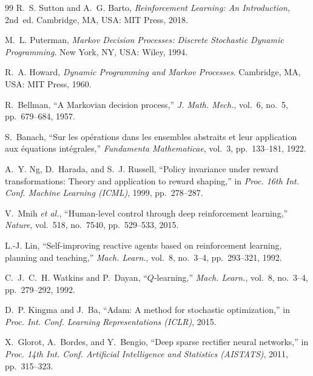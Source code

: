 \documentclass[11pt,letterpaper]{article}
\begin{document}

\begin{thebibliography}{99}
R.~S. Sutton and A.~G. Barto, \emph{Reinforcement Learning: An Introduction}, 2nd~ed. Cambridge, MA, USA: MIT Press, 2018.

M.~L. Puterman, \emph{Markov Decision Processes: Discrete Stochastic Dynamic Programming}. New York, NY, USA: Wiley, 1994.

R.~A. Howard, \emph{Dynamic Programming and Markov Processes}. Cambridge, MA, USA: MIT Press, 1960.

R.~Bellman, ``A Markovian decision process,'' \emph{J. Math. Mech.}, vol.~6, no.~5, pp.~679--684, 1957.

S.~Banach, ``Sur les op\'erations dans les ensembles abstraits et leur application aux \'equations int\'egrales,'' \emph{Fundamenta Mathematicae}, vol.~3, pp.~133--181, 1922.

A.~Y. Ng, D.~Harada, and S.~J. Russell, ``Policy invariance under reward transformations: Theory and application to reward shaping,'' in \emph{Proc. 16th Int. Conf. Machine Learning (ICML)}, 1999, pp.~278--287.

V.~Mnih \emph{et al.}, ``Human-level control through deep reinforcement learning,'' \emph{Nature}, vol.~518, no.~7540, pp.~529--533, 2015.

L.-J. Lin, ``Self-improving reactive agents based on reinforcement learning, planning and teaching,'' \emph{Mach. Learn.}, vol.~8, no.~3--4, pp.~293--321, 1992.

C.~J.~C.~H. Watkins and P.~Dayan, ``$Q$-learning,'' \emph{Mach. Learn.}, vol.~8, no.~3--4, pp.~279--292, 1992.

D.~P. Kingma and J.~Ba, ``Adam: A method for stochastic optimization,'' in \emph{Proc. Int. Conf. Learning Representations (ICLR)}, 2015.

X.~Glorot, A.~Bordes, and Y.~Bengio, ``Deep sparse rectifier neural networks,'' in \emph{Proc. 14th Int. Conf. Artificial Intelligence and Statistics (AISTATS)}, 2011, pp.~315--323.


\end{thebibliography}
\end{document}
